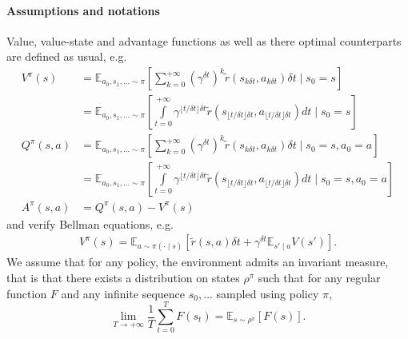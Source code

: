 \documentclass[11pt]{article}
\newcommand{\deltat}{{\delta t}}
\newcommand{\E}{\mathbb{E}}
\begin{document}
\paragraph{Assumptions and notations}
Value, value-state and advantage functions as well as there
optimal counterparts are defined as usual, e.g.
\begin{align}
	V^\pi(s) &= \E_{a_0, s_1, \ldots \sim \pi}
	\left[
		\sum\limits_{k=0}^{+\infty}
		(\gamma^{\deltat})^k \tilde{r}(s_{k\deltat}, a_{k\deltat}) \deltat
		\mid s_0 = s 
                   \right]\\
                 &= \E_{a_0, s_1, \ldots \sim \pi}
	\left[
		\int\limits_{t=0}^{+\infty}
		\gamma^{\lfloor t / \deltat \rfloor \deltat} \tilde{r}(s_{\lfloor t / \deltat \rfloor \deltat}, a_{\lfloor t / \deltat \rfloor \deltat}) dt
		\mid s_0 = s 
	\right]\\
	Q^\pi(s, a) &= \E_{a_0, s_1, \ldots \sim \pi}
	\left[
		\sum\limits_{k=0}^{+\infty}
		(\gamma^{\deltat})^k \tilde{r}(s_{k\deltat}, a_{k\deltat}) \deltat
		\mid s_0 = s, a_0 = a
                   \right]\\
                 &= \E_{a_0, s_1, \ldots \sim \pi}
	\left[
		\int\limits_{t=0}^{+\infty}
		\gamma^{\lfloor t / \deltat \rfloor \deltat} \tilde{r}(s_{\lfloor t / \deltat \rfloor \deltat}, a_{\lfloor t / \deltat \rfloor \deltat}) dt
		\mid s_0 = s , a_0 = a
	\right]\\
	A^\pi(s,a ) &= Q^\pi(s, a) - V^\pi(s)
\end{align}
and verify Bellman equations, e.g.
\begin{align}
	V^\pi(s) = \E_{a\sim\pi(\cdot\mid s)}
	\left[
		\tilde{r}(s, a) \deltat +
		\gamma^\deltat \E_{s'\mid a} V(s')
	\right].
\end{align}
We assume that for any policy, the environment admits an invariant
measure, that is that there exists a distribution on states $\rho^\pi$ such that for
any regular function $F$ and any infinite sequence $s_0, \ldots$ sampled using policy
$\pi$,
\begin{equation}
	\lim\limits_{T\to+\infty}
	\frac{1}{T}
	\sum\limits_{t=0}^T F(s_t) =
	\E_{s\sim \rho^\pi}\left[
		F(s)
	\right].
	\label{eq:ergodic}
\end{equation}
\end{document}
